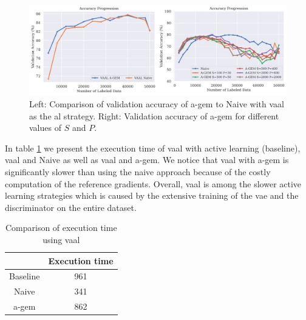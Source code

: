 \begin{figure}[h]
    \centering
    \includegraphics[width=\linewidth]{images/results_CAL/AGEM_plots.png}
    \caption[Continual Active Learning with \gls{a-gem}]{Left: Comparison of validation accuracy of \gls{a-gem} to Naive with \gls{vaal} as the \gls{al} strategy.
    Right: Validation accuracy of \gls{a-gem} for different values of $S$ and $P$.}
    \label{fig:Evaluation:Results:CAL:AGEM}
\end{figure}

In table \ref{fig:Evaluation:CAL:VAAL_AGEM_Time} we present the execution time of \gls{vaal} with active learning (baseline), \gls{vaal} and Naive as well as \gls{vaal}
and \gls{a-gem}. We notice that \gls{vaal} with \gls{a-gem} is significantly slower than using the naive approach because of the costly computation of the reference
gradients. Overall, \gls{vaal} is among the slower active learning strategies which is caused by the extensive training of the \gls{vae} and the discriminator on the
entire dataset. \par

\begin{table}[h]
    \centering
    \begin{tabular}{c | c } 
         & Execution time\\ 
        \hline 
        Baseline & 961 \\
        Naive & 341 \\
        \gls{a-gem} & 862 \\
    \end{tabular}
    \caption{Comparison of execution time using \gls{vaal}}
    \label{fig:Evaluation:CAL:VAAL_AGEM_Time}
\end{table}


